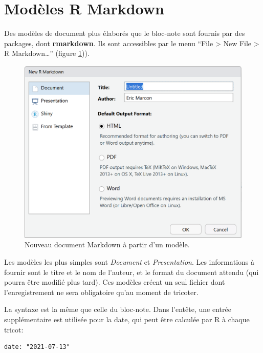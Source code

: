 \documentclass[
  12pt,
  french,
  a4paper,
  extrafontsizes,onecolumn,openright
  ]{memoir}
\begin{document}
\hypertarget{moduxe8les-r-markdown}{%
\section{Modèles R Markdown}\label{moduxe8les-r-markdown}}

Des modèles de document plus élaborés que le bloc-note sont fournis par des packages, dont \textbf{rmarkdown}.
Ils sont accessibles par le menu \enquote{File \textgreater{} New File \textgreater{} R Markdown\ldots{}} (figure \ref{fig:e-rmd1})).



\scriptsize

\begin{figure}

{\centering \includegraphics[width=0.8\linewidth]{images/e-rmd1} 

}

\caption{Nouveau document Markdown à partir d'un modèle.}\label{fig:e-rmd1}
\end{figure}

\normalsize

Les modèles les plus simples sont \emph{Document} et \emph{Presentation}.
Les informations à fournir sont le titre et le nom de l'auteur, et le format du document attendu (qui pourra être modifié plus tard).
Ces modèles créent un seul fichier dont l'enregistrement ne sera obligatoire qu'au moment de tricoter.

La syntaxe est la même que celle du bloc-note.
Dans l'entête, une entrée supplémentaire est utilisée pour la date, qui peut être calculée par R à chaque tricot:

\begin{verbatim}
date: "2021-07-13"
\end{verbatim}
\end{document}
